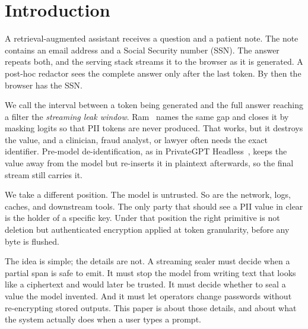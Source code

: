 \documentclass[conference]{IEEEtran}
\begin{document}
\section{Introduction}
\label{sec:intro}

A retrieval-augmented assistant receives a question and a patient note. The note contains an email address and a Social Security number (SSN). The answer repeats both, and the serving stack streams it to the browser as it is generated. A post-hoc redactor sees the complete answer only after the last token. By then the browser has the SSN.

We call the interval between a token being generated and the full answer reaching a filter the \emph{streaming leak window}. Ram~\cite{ram2025constrained} names the same gap and closes it by masking logits so that PII tokens are never produced. That works, but it destroys the value, and a clinician, fraud analyst, or lawyer often needs the exact identifier. Pre-model de-identification, as in PrivateGPT Headless~\cite{privategpt}, keeps the value away from the model but re-inserts it in plaintext afterwards, so the final stream still carries it.

We take a different position. The model is untrusted. So are the network, logs, caches, and downstream tools. The only party that should see a PII value in clear is the holder of a specific key. Under that position the right primitive is not deletion but authenticated encryption applied at token granularity, before any byte is flushed.

The idea is simple; the details are not. A streaming sealer must decide when a partial span is safe to emit. It must stop the model from writing text that looks like a ciphertext and would later be trusted. It must decide whether to seal a value the model invented. And it must let operators change passwords without re-encrypting stored outputs. This paper is about those details, and about what the system actually does when a user types a prompt.
\end{document}
